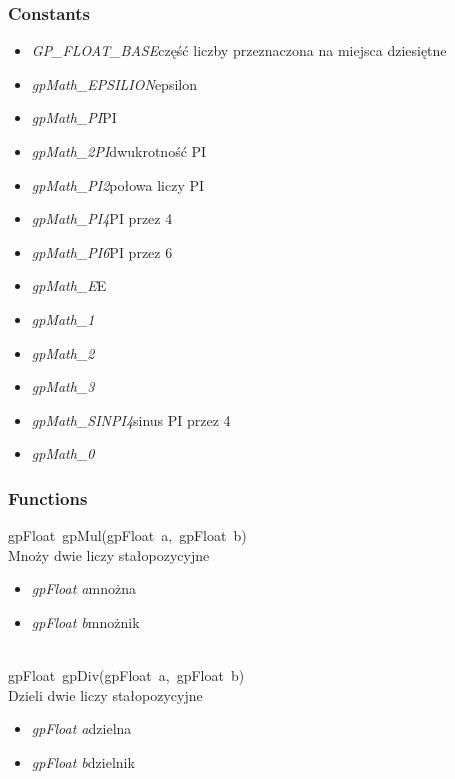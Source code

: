\subsubsection{Constants}
\begin{itemize}
\item \textit{GP_FLOAT_BASE}\qquad część liczby przeznaczona na miejsca dziesiętne
\item \textit{gpMath_EPSILION}\qquad epsilon 
\item \textit{gpMath_PI}\qquad PI
\item \textit{gpMath_2PI}\qquad dwukrotność PI
\item \textit{gpMath_PI2}\qquad połowa liczy PI
\item \textit{gpMath_PI4}\qquad PI przez 4
\item \textit{gpMath_PI6}\qquad PI przez 6
\item \textit{gpMath_E}\qquad E
\item \textit{gpMath_1}
\item \textit{gpMath_2}
\item \textit{gpMath_3}
\item \textit{gpMath_SINPI4}\qquad sinus PI przez 4
\item \textit{gpMath_0}
\end{itemize}
\subsubsection{Functions}
\mbox{\textsf{gpFloat gpMul(gpFloat a, gpFloat b)}} \\ \indent Mnoży dwie liczy stałopozycyjne
	\begin{itemize}
		\item \textit{gpFloat a}\quad mnożna
		\item \textit{gpFloat b}\quad mnożnik
	\end{itemize}

 \ \\
\mbox{\textsf{gpFloat gpDiv(gpFloat a, gpFloat b)}} \\ \indent Dzieli dwie liczy stałopozycyjne
	\begin{itemize}
		\item \textit{gpFloat a}\quad dzielna
		\item \textit{gpFloat b}\quad dzielnik
	\end{itemize}

